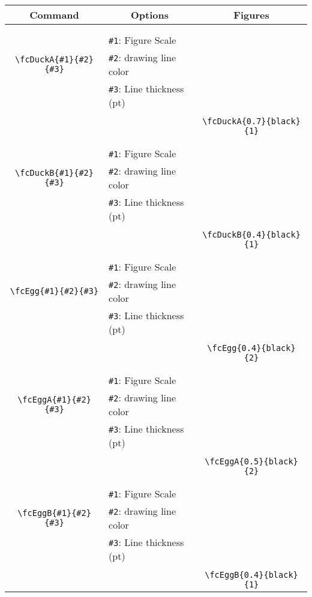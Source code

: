 \documentclass{article}
\begin{document}
\begin{table}[H]\centering\begin{tabular}{|c|l|c|}\hline {\bf Command}& \multicolumn{1}{c|}{{\bf Options}} & {\bf Figures}\\  \hline	&&\multirow{5}{*}{\fcDuckA{0.7}{black}{1}}\\	&&\\	&\verb|#1|: Figure Scale &\\	\verb|\fcDuckA{#1}{#2}{#3}|&	\verb|#2|: drawing line color &\\	&\verb|#3|: Line thickness (pt) &\\ &&\\&&	\verb|\fcDuckA{0.7}{black}{1}|\\\hline 	
	&&\multirow{5}{*}{\fcDuckB{0.4}{black}{1}}\\	&&\\	&\verb|#1|: Figure Scale &\\	\verb|\fcDuckB{#1}{#2}{#3}|&	\verb|#2|: drawing line color &\\	&\verb|#3|: Line thickness (pt) &\\ &&\\&&	\verb|\fcDuckB{0.4}{black}{1}|\\\hline 	
	&&\multirow{5}{*}{\fcEgg{0.4}{black}{2}}\\	&&\\	&\verb|#1|: Figure Scale &\\	\verb|\fcEgg{#1}{#2}{#3}|&	\verb|#2|: drawing line color &\\	&\verb|#3|: Line thickness (pt) &\\ &&\\&&	\verb|\fcEgg{0.4}{black}{2}|\\\hline 	
	&&\multirow{5}{*}{\fcEggA{0.5}{black}{2}}\\	&&\\	&\verb|#1|: Figure Scale &\\	\verb|\fcEggA{#1}{#2}{#3}|&	\verb|#2|: drawing line color &\\	&\verb|#3|: Line thickness (pt) &\\ &&\\&&	\verb|\fcEggA{0.5}{black}{2}|\\\hline 	
	&&\multirow{5}{*}{\fcEggB{0.4}{black}{1}}\\	&&\\	&\verb|#1|: Figure Scale &\\	\verb|\fcEggB{#1}{#2}{#3}|&	\verb|#2|: drawing line color &\\	&\verb|#3|: Line thickness (pt) &\\ &&\\&&	\verb|\fcEggB{0.4}{black}{1}|\\\hline 	

\end{tabular}
\end{table}
\end{document}
